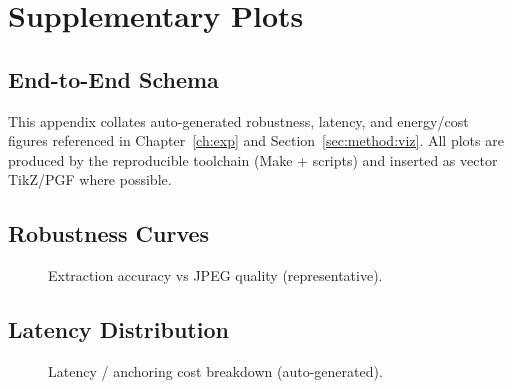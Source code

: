 \chapter{Supplementary Plots}\label{app:plots}
\section*{End-to-End Schema}


This appendix collates auto-generated robustness, latency, and energy/cost
figures referenced in Chapter~\ref{ch:exp} and Section~\ref{sec:method:viz}.
All plots are produced by the reproducible toolchain (Make + scripts) and
inserted as vector TikZ/PGF where possible.

\section*{Robustness Curves}
\begin{figure}[ht]
  \centering
  \caption{Extraction accuracy vs JPEG quality (representative).}\label{fig:app:robustness_curve}
\end{figure}

\section*{Latency Distribution}
\begin{figure}[ht]
  \centering
  \caption{Latency / anchoring cost breakdown (auto-generated).}\label{fig:app:anchoring_cost}
\end{figure}


